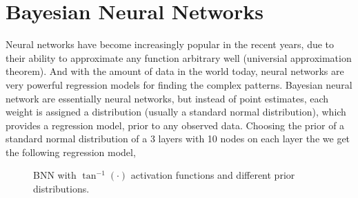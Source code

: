 \section{Bayesian Neural Networks}\label{BNN}
Neural networks have become increasingly popular in the recent years, due to their ability to
approximate any function arbitrary well (universial approximation theorem). And with the amount of
data in the world today, neural
networks are very powerful regression models for finding the complex patterns. Bayesian neural
network are essentially neural networks, but instead of point estimates, each weight is assigned a
distribution (usually a standard normal distribution), which provides a regression model, 
prior to any observed data. Choosing the prior of a standard normal distribution of a 
3 layers with 10 nodes on each layer the we get the following regression model, 
\begin{figure}
    \centering
    \qquad
    \caption{BNN with $\tan^{-1}(\cdot)$ activation functions and different prior distributions. }%
    \label{fig:example2}%
\end{figure}

